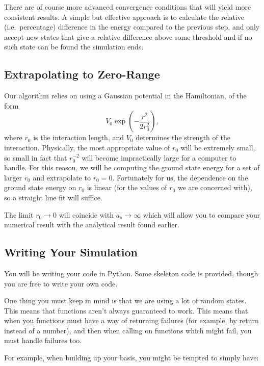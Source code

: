\documentclass[
  a4paper,             %
  11pt,                %
  oneside,             %
  onecolumn,           %
  bibliography=totoc,  %
  final,               %
]{scrartcl}
\begin{document}
There are of course more advanced convergence conditions that will yield more
consistent results.  A simple but effective approach is to calculate the
relative (i.e.~percentage) difference in the energy compared to the previous
step, and only accept new states that give a relative difference above some
threshold and if no such state can be found the simulation ends.

\subsection{Extrapolating to Zero-Range}
\label{subsec:extrapolating_to_zero-range}

Our algorithm relies on using a Gaussian potential in the Hamiltonian, of the
form
\begin{equation}
  V_0 \exp{\left(-\frac{r^2}{2r_0^2}\right)},
\end{equation}
where \(r_0\) is the interaction length, and \(V_0\) determines the strength of
the interaction.  Physically, the most appropriate value of \(r_{0}\) will be
extremely small, so small in fact that \(r_{0}^{-2}\) will become impractically
large for a computer to handle.  For this reason, we will be computing the
ground state energy for a set of larger \(r_{0}\) and extrapolate to \(r_{0} =
0\).  Fortunately for us, the dependence on the ground state energy on \(r_{0}\)
is linear (for the values of \(r_{0}\) we are concerned with), so a straight
line fit will suffice.

The limit \(r_{0} \to 0\) will coincide with \(a_{s} \to \infty\) which will
allow you to compare your numerical result with the analytical result found
earlier.

\subsection{Writing Your Simulation}
\label{subsec:writing_your_simulation}

You will be writing your code in Python.  Some skeleton code is provided, though
you are free to write your own code.

One thing you must keep in mind is that we are using a lot of random states.
This means that functions aren't always guaranteed to work.  This means that
when you functions must have a way of returning failures (for example, by return
 instead of a number), and then when calling on functions
which might fail, you must handle failures too.

For example, when building up your basis, you might be tempted to simply have:
\end{document}
